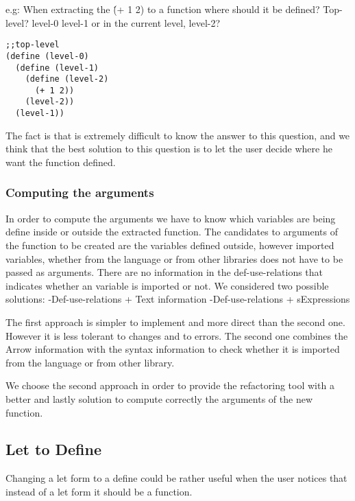 e.g: When extracting the \'(+ 1 2) to a function where should it be defined?
Top-level? level-0 level-1 or in the current level, level-2?
\begin{lstlisting}[basicstyle=\ttfamily, caption="Example"]
;;top-level
(define (level-0)
  (define (level-1)
    (define (level-2)
      (+ 1 2))
    (level-2))
  (level-1))
\end{lstlisting}

The fact is that is extremely difficult to know the answer to this question, and
we think that the best solution to this question is to let the user decide where
he want the function defined.


\subsubsection{Computing the arguments}

In order to compute the arguments we have to know which variables are being define
inside or outside the extracted function.
The candidates to arguments of the function to be created are the variables defined
outside, however imported variables, whether from the language or from other libraries
does not have to be passed as arguments.
There are no information in the def-use-relations that indicates whether an variable
is imported or not.
We considered two possible solutions:
  -Def-use-relations + Text information
  -Def-use-relations + sExpressions

The first approach is simpler to implement and more direct than the second one.
However it is less tolerant to changes and to errors.
The second one combines the Arrow information with the syntax information to
check whether it is imported from the language or from other library.

We choose the second approach in order to provide the refactoring tool with a
better and lastly solution to compute correctly the arguments of the new function.

\subsection{Let to Define} %
Changing a let form to a define could be rather useful when the user
notices that instead of a let form it should be a function.

